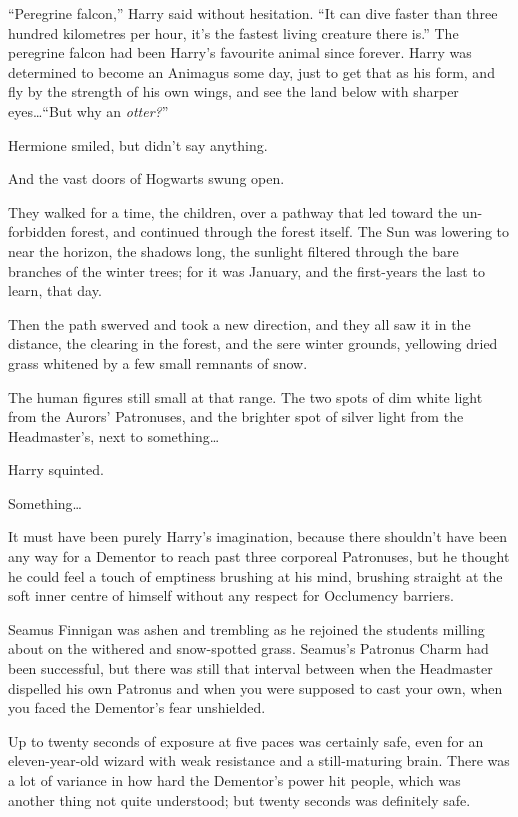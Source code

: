 “Peregrine falcon,” Harry said without hesitation. “It can dive faster than three hundred kilometres per hour, it’s the fastest living creature there is.” The peregrine falcon had been Harry’s favourite animal since forever. Harry was determined to become an Animagus some day, just to get that as his form, and fly by the strength of his own wings, and see the land below with sharper eyes…“But why an \emph{otter?}”

Hermione smiled, but didn’t say anything.

And the vast doors of Hogwarts swung open.

They walked for a time, the children, over a pathway that led toward the un-forbidden forest, and continued through the forest itself. The Sun was lowering to near the horizon, the shadows long, the sunlight filtered through the bare branches of the winter trees; for it was January, and the first-years the last to learn, that day.

Then the path swerved and took a new direction, and they all saw it in the distance, the clearing in the forest, and the sere winter grounds, yellowing dried grass whitened by a few small remnants of snow.

The human figures still small at that range. The two spots of dim white light from the Aurors’ Patronuses, and the brighter spot of silver light from the Headmaster’s, next to something…

Harry squinted.

Something…

It must have been purely Harry’s imagination, because there shouldn’t have been any way for a Dementor to reach past three corporeal Patronuses, but he thought he could feel a touch of emptiness brushing at his mind, brushing straight at the soft inner centre of himself without any respect for Occlumency barriers.

\later

Seamus Finnigan was ashen and trembling as he rejoined the students milling about on the withered and snow-spotted grass. Seamus’s Patronus Charm had been successful, but there was still that interval between when the Headmaster dispelled his own Patronus and when you were supposed to cast your own, when you faced the Dementor’s fear unshielded.

Up to twenty seconds of exposure at five paces was certainly safe, even for an eleven-year-old wizard with weak resistance and a still-maturing brain. There was a lot of variance in how hard the Dementor’s power hit people, which was another thing not quite understood; but twenty seconds was definitely safe.

